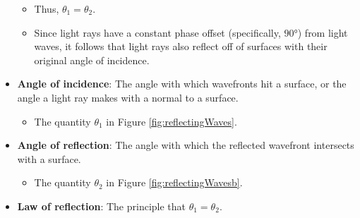 \documentclass[../notes.tex]{subfiles}
\begin{document}
\begin{itemize}
\begin{itemize}
        \item Thus, $\theta_1=\theta_2$.
        \item Since light rays have a constant phase offset (specifically, $\ang{90}$) from light waves, it follows that light rays also reflect off of surfaces with their original angle of incidence.
    \end{itemize}
    \item \textbf{Angle of incidence}: The angle with which wavefronts hit a surface, or the angle a light ray makes with a normal to a surface.
    \begin{itemize}
        \item The quantity $\theta_1$ in Figure \ref{fig:reflectingWaves}.
    \end{itemize}
    \item \textbf{Angle of reflection}: The angle with which the reflected wavefront intersects with a surface.
    \begin{itemize}
        \item The quantity $\theta_2$ in Figure \ref{fig:reflectingWavesb}.
    \end{itemize}
    \item \textbf{Law of reflection}: The principle that $\theta_1=\theta_2$.
\end{itemize}
\end{document}
